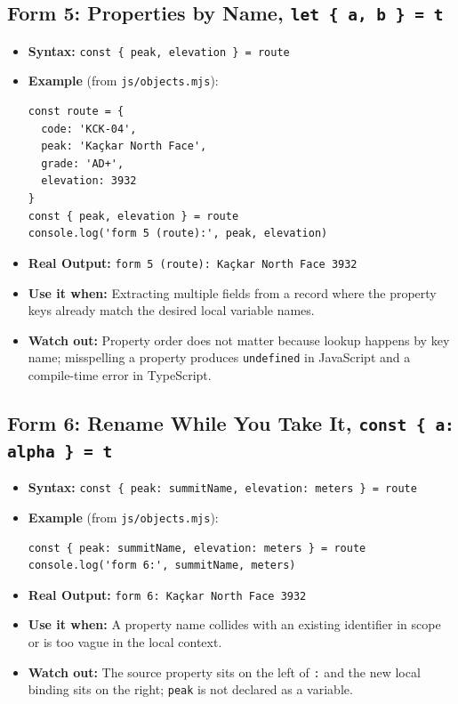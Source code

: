 \documentclass[11pt, a4paper]{article}
\begin{document}
\subsection{Form 5: Properties by Name, \texttt{let \{ a, b \} = t}}
\begin{itemize}
  \item \textbf{Syntax:} \texttt{const \{ peak, elevation \} = route}
  \item \textbf{Example} (from \texttt{js/objects.mjs}):
\begin{lstlisting}
const route = {
  code: 'KCK-04',
  peak: 'Kaçkar North Face',
  grade: 'AD+',
  elevation: 3932
}
const { peak, elevation } = route
console.log('form 5 (route):', peak, elevation)
\end{lstlisting}
  \item \textbf{Real Output:} \texttt{form 5 (route): Kaçkar North Face 3932}
  \item \textbf{Use it when:} Extracting multiple fields from a record where the property keys already match the desired local variable names.
  \item \textbf{Watch out:} Property order does not matter because lookup happens by key name; misspelling a property produces \texttt{undefined} in JavaScript and a compile-time error in TypeScript.
\end{itemize}

\subsection{Form 6: Rename While You Take It, \texttt{const \{ a: alpha \} = t}}
\begin{itemize}
  \item \textbf{Syntax:} \texttt{const \{ peak: summitName, elevation: meters \} = route}
  \item \textbf{Example} (from \texttt{js/objects.mjs}):
\begin{lstlisting}
const { peak: summitName, elevation: meters } = route
console.log('form 6:', summitName, meters)
\end{lstlisting}
  \item \textbf{Real Output:} \texttt{form 6: Kaçkar North Face 3932}
  \item \textbf{Use it when:} A property name collides with an existing identifier in scope or is too vague in the local context.
  \item \textbf{Watch out:} The source property sits on the left of \texttt{:} and the new local binding sits on the right; \texttt{peak} is not declared as a variable.
\end{itemize}
\end{document}
